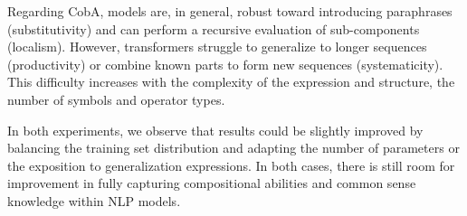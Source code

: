 Regarding CobA, models are, in general, robust toward introducing paraphrases (substitutivity) and can perform a recursive evaluation of sub-components (localism). However, transformers struggle to generalize to longer sequences (productivity) or combine known parts to form new sequences (systematicity). This difficulty increases with the complexity of the expression and structure, the number of symbols and operator types. 

In both experiments, we observe that results could be slightly improved by balancing the training set distribution and adapting the number of parameters or the exposition to generalization expressions. In both cases, there is still room for improvement in fully capturing compositional abilities and common sense knowledge within NLP models.
